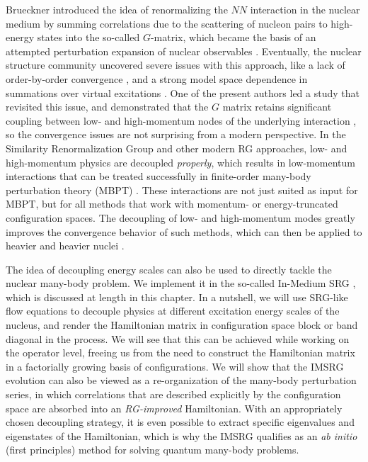 {Brueckner introduced the idea of renormalizing the $NN$ interaction in the
nuclear medium by summing correlations due to the scattering of nucleon
pairs to high-energy states into the so-called $G$-matrix, which became
the basis of an attempted perturbation expansion of nuclear observables 
\cite{Brueckner:1954qf,Brueckner:1955rw,Bethe:1957qv,Goldstone:1957zz,Day:1967zl,Brandow:1967tg}.
Eventually, the nuclear structure community uncovered severe issues with
this approach, like a lack of order-by-order convergence 
\cite{Barrett:1970jl,Kirson:1971la,Barrett:1972bs,Kirson:1974oq,Goode:1974pi},
and a strong model space dependence in summations over virtual excitations
\cite{Vary:1973dn}. One of the present authors led a study that revisited 
this issue, and demonstrated that the $G$ matrix retains significant coupling 
between low- and high-momentum nodes of the underlying interaction 
\cite{Bogner:2010pq}, so the convergence issues are not surprising from a 
modern perspective. In the Similarity Renormalization Group \cite{Glazek:1993il,Wegner:1994dk}
and other modern RG approaches, low- and high-momentum physics are decoupled 
\emph{properly}, which results in low-momentum interactions that can be
treated successfully in finite-order many-body perturbation theory (MBPT) 
\cite{Bogner:2006qf,Bogner:2010pq,Roth:2010ys,Tichai:2016vl}. These 
interactions are not just suited as input for MBPT, but for all
methods that work with momentum- or energy-truncated configuration 
spaces. The decoupling of low- and high-momentum modes greatly improves 
the convergence behavior of such methods, which can then be applied to 
heavier and heavier nuclei
\cite{Barrett:2013oq,Jurgenson:2013fk,Hergert:2013ij,Roth:2014fk,Binder:2014fk,Hagen:2014ve,Hagen:2016rb}.

The idea of decoupling energy scales can also be used to directly
tackle the nuclear many-body problem. We implement it in the so-called
In-Medium SRG \cite{Tsukiyama:2011uq,Hergert:2013mi,Hergert:2016jk},
which is discussed at length in this chapter. In a nutshell, we will 
use SRG-like flow equations to decouple physics at different excitation 
energy scales of the nucleus, and render the Hamiltonian matrix in 
configuration space block or band diagonal in the process. We will see
that this can be achieved while working on the operator level, freeing
us from the need to construct the Hamiltonian matrix in a factorially 
growing basis of configurations. We will show that the IMSRG evolution
can also be viewed as a re-organization of the many-body perturbation
series, in which correlations that are described explicitly by the 
configuration space are absorbed into an \emph{RG-improved} Hamiltonian. 
With an appropriately chosen decoupling strategy, it is even possible to 
extract specific eigenvalues and eigenstates of the Hamiltonian, which is
why the IMSRG qualifies as an \emph{ab initio} (first principles) method 
for solving quantum many-body problems.

}
